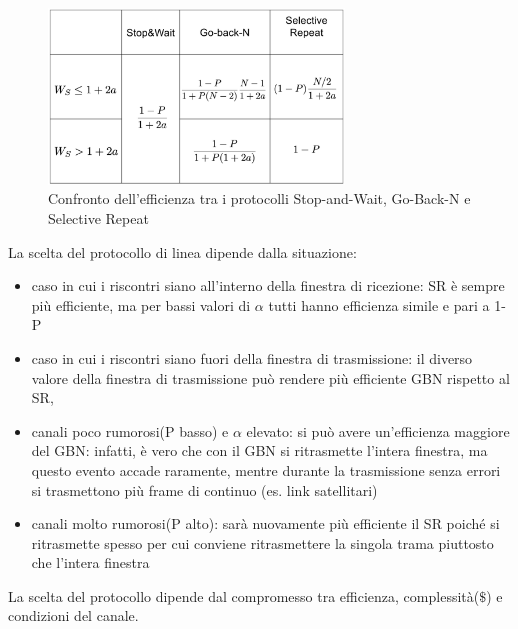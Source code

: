 \begin{figure}[htbp]
    \centering
    \includegraphics[width=0.7\textwidth]{images/confrontoprotocolli.png}
    \caption{Confronto dell'efficienza tra i protocolli Stop-and-Wait, Go-Back-N e Selective Repeat}
\end{figure}
        La scelta del protocollo di linea dipende dalla situazione:
        \begin{itemize}
            \item caso in cui i riscontri siano all'interno della finestra di ricezione: SR è sempre più efficiente, ma per bassi valori di $\alpha$ tutti hanno efficienza simile e pari a 1-P
            \item caso in cui i riscontri siano fuori della finestra di trasmissione: il diverso valore della finestra di trasmissione può
rendere più efficiente GBN rispetto al SR, 
            \item canali poco rumorosi(P basso) e $\alpha$ elevato: si
può avere un'efficienza maggiore del GBN: infatti, è vero che
con il GBN si ritrasmette l'intera finestra, ma questo evento
accade raramente, mentre durante la trasmissione senza errori
si trasmettono più frame di continuo (es. link satellitari) 
            \item canali molto rumorosi(P alto): sarà nuovamente più
efficiente il SR poiché si ritrasmette spesso per cui conviene
ritrasmettere la singola trama piuttosto che l'intera finestra
        \end{itemize}
        La scelta del protocollo dipende dal compromesso tra efficienza, complessità($\$$) e condizioni del canale.

        